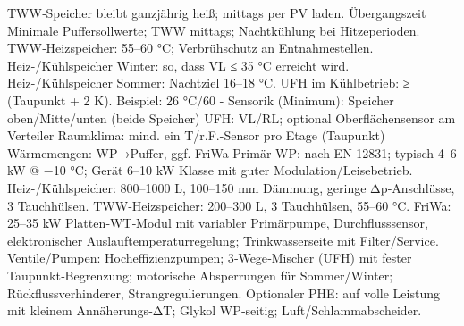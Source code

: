 \markdownRendererUlItem TWW‑Speicher bleibt ganzjährig heiß; mittags per PV laden.\markdownRendererUlItemEnd 
\markdownRendererUlItem Übergangszeit\markdownRendererUlItemEnd 
\markdownRendererUlItem Minimale Puffersollwerte; TWW mittags; Nachtkühlung bei Hitzeperioden.\markdownRendererUlItemEnd 
\markdownRendererUlEnd \markdownRendererInterblockSeparator
{}
\markdownRendererSectionEnd \markdownRendererSectionBegin
{}\markdownRendererInterblockSeparator
{}\markdownRendererUlBeginTight
\markdownRendererUlItem TWW‑Heizspeicher: 55–60 °C; Verbrühschutz an Entnahmestellen.\markdownRendererUlItemEnd 
\markdownRendererUlItem Heiz-/Kühlspeicher Winter: so, dass VL ≤ 35 °C erreicht wird.\markdownRendererUlItemEnd 
\markdownRendererUlItem Heiz-/Kühlspeicher Sommer: Nachtziel 16–18 °C.\markdownRendererUlItemEnd 
\markdownRendererUlItem UFH im Kühlbetrieb: ≥ (Taupunkt + 2 K). Beispiel: 26 °C/60 - Sensorik (Minimum):\markdownRendererUlItemEnd 
\markdownRendererUlItem Speicher oben/Mitte/unten (beide Speicher)\markdownRendererUlItemEnd 
\markdownRendererUlItem UFH: VL/RL; optional Oberflächensensor am Verteiler\markdownRendererUlItemEnd 
\markdownRendererUlItem Raumklima: mind. ein T/r.F.-Sensor pro Etage (Taupunkt)\markdownRendererUlItemEnd 
\markdownRendererUlItem Wärmemengen: WP→Puffer, ggf. FriWa‑Primär\markdownRendererUlItemEnd 
\markdownRendererUlEndTight \markdownRendererInterblockSeparator
{}
\markdownRendererSectionEnd \markdownRendererSectionBegin
{}\markdownRendererInterblockSeparator
{}\markdownRendererUlBeginTight
\markdownRendererUlItem WP: nach EN 12831; typisch 4–6 kW @ −10 °C; Gerät 6–10 kW Klasse mit guter Modulation/Leisebetrieb.\markdownRendererUlItemEnd 
\markdownRendererUlItem Heiz-/Kühlspeicher: 800–1000 L, 100–150 mm Dämmung, geringe Δp‑Anschlüsse, 3 Tauchhülsen.\markdownRendererUlItemEnd 
\markdownRendererUlItem TWW‑Heizspeicher: 200–300 L, 3 Tauchhülsen, 55–60 °C.\markdownRendererUlItemEnd 
\markdownRendererUlItem FriWa: 25–35 kW Platten‑WT‑Modul mit variabler Primärpumpe, Durchflusssensor, elektronischer Auslauftemperaturregelung; Trinkwasserseite mit Filter/Service.\markdownRendererUlItemEnd 
\markdownRendererUlItem Ventile/Pumpen: Hocheffizienzpumpen; 3‑Wege‑Mischer (UFH) mit fester Taupunkt‑Begrenzung; motorische Absperrungen für Sommer/Winter; Rückflussverhinderer, Strangregulierungen.\markdownRendererUlItemEnd 
\markdownRendererUlItem Optionaler PHE: auf volle Leistung mit kleinem Annäherungs‑ΔT; Glykol WP‑seitig; Luft/Schlammabscheider.\markdownRendererUlItemEnd 
